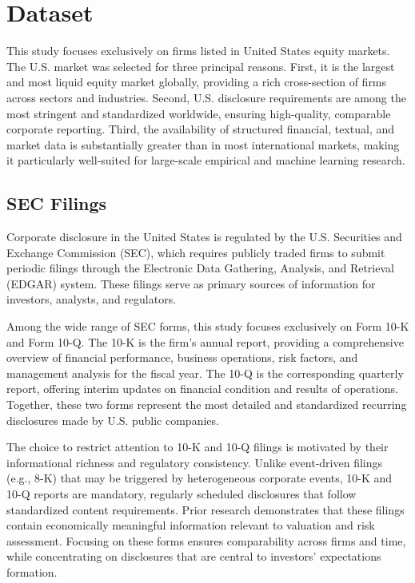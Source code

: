 \chapter{Dataset}

This study focuses exclusively on firms listed in United States equity markets. 
The U.S. market was selected for three principal reasons. 
First, it is the largest and most liquid equity market globally, providing a rich cross-section of firms across sectors and industries. 
Second, U.S. disclosure requirements are among the most stringent and standardized worldwide, ensuring high-quality, comparable corporate reporting. 
Third, the availability of structured financial, textual, and market data is substantially greater than in most international markets, making it particularly well-suited for large-scale empirical and machine learning research.

\section{SEC Filings}

Corporate disclosure in the United States is regulated by the U.S. Securities and Exchange Commission (SEC), which requires publicly traded firms to submit periodic filings through the Electronic Data Gathering, Analysis, and Retrieval (EDGAR) system. 
These filings serve as primary sources of information for investors, analysts, and regulators.

Among the wide range of SEC forms, this study focuses exclusively on Form 10-K and Form 10-Q. 
The 10-K is the firm's annual report, providing a comprehensive overview of financial performance, business operations, risk factors, and management analysis for the fiscal year. 
The 10-Q is the corresponding quarterly report, offering interim updates on financial condition and results of operations.
Together, these two forms represent the most detailed and standardized recurring disclosures made by U.S. public companies.

The choice to restrict attention to 10-K and 10-Q filings is motivated by their informational richness and regulatory consistency. 
Unlike event-driven filings (e.g., 8-K) that may be triggered by heterogeneous corporate events, 10-K and 10-Q reports are mandatory, regularly scheduled disclosures that follow standardized content requirements. 
Prior research demonstrates that these filings contain economically meaningful information relevant to valuation and risk assessment\cite{textual-analysis-dictionaries-and-10ks}. 
Focusing on these forms ensures comparability across firms and time, while concentrating on disclosures that are central to investors' expectations formation.

